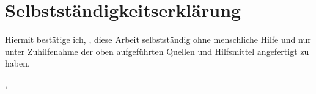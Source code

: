 \chapter{Selbstständigkeitserklärung}

Hiermit bestätige ich, \getauthor, diese Arbeit selbstständig ohne menschliche Hilfe und nur unter Zuhilfenahme der oben aufgeführten Quellen und Hilfsmittel angefertigt zu haben.

\vspace{3cm}

\noindent\getauthor, \getdate

